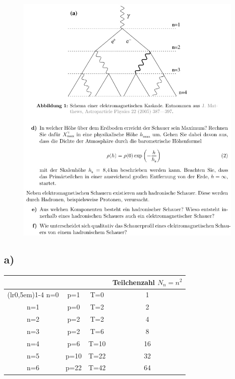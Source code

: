     \begin{figure}[H]
        \centering
        \includegraphics[width=\textwidth]{images/Aufgabe19b.jpg}
        \label{fig:2}
    \end{figure}

\subsection{a)}

\begin{table}[H]
\centering
    \begin{tabular}{c c c c}
    \toprule
    \multicolumn{1}{c}{} & \multicolumn{1}{c}{} & \multicolumn{1}{c}{} & \multicolumn{1}{c}{Teilchenzahl $N_n=n^2$}\\
    \cmidrule(lr{0,5em}){1-4}
    n=0 & p=1 & T=0 & 1\\        
    n=1 & p=0 & T=2 & 2\\       
    n=2 & p=2 & T=2 & 4\\
    n=3 & p=2 & T=6 & 8\\
    n=4 & p=6 & T=10 & 16\\
    n=5 & p=10 & T=22 & 32\\        
    n=6 & p=22 & T=42 & 64\\
    \bottomrule
    \end{tabular}
\label{tab:1}
\end{table}

